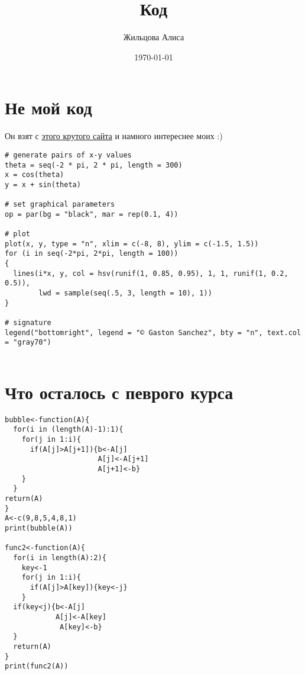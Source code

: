 \documentclass[12pt, a4paper]{article}
\title{Код}
\date{\today}
\author{Жильцова Алиса}
\begin{document}
 

\maketitle

\section{Не мой код}

 Он взят с \href{http://www.r-graph-gallery.com/}{этого крутого сайта} и намного интереснее моих :)
\begin{verbatim}
# generate pairs of x-y values
theta = seq(-2 * pi, 2 * pi, length = 300)
x = cos(theta)
y = x + sin(theta) 
 
# set graphical parameters
op = par(bg = "black", mar = rep(0.1, 4))
 
# plot
plot(x, y, type = "n", xlim = c(-8, 8), ylim = c(-1.5, 1.5))
for (i in seq(-2*pi, 2*pi, length = 100))
{
  lines(i*x, y, col = hsv(runif(1, 0.85, 0.95), 1, 1, runif(1, 0.2, 0.5)), 
        lwd = sample(seq(.5, 3, length = 10), 1))          
}
 
# signature
legend("bottomright", legend = "© Gaston Sanchez", bty = "n", text.col = "gray70")
 
\end{verbatim}
\newpage
\section{Что осталось с певрого курса}
\begin{verbatim}
bubble<-function(A){
  for(i in (length(A)-1):1){
    for(j in 1:i){
      if(A[j]>A[j+1]){b<-A[j]
                      A[j]<-A[j+1]
                      A[j+1]<-b}
    }
  }
return(A)
}
A<-c(9,8,5,4,8,1)
print(bubble(A))

func2<-function(A){
  for(i in length(A):2){
    key<-1
    for(j in 1:i){
      if(A[j]>A[key]){key<-j}
    }
  if(key<j){b<-A[j]
            A[j]<-A[key]
             A[key]<-b}
  }
  return(A)
}
print(func2(A))
\end{verbatim}
\end{document}
